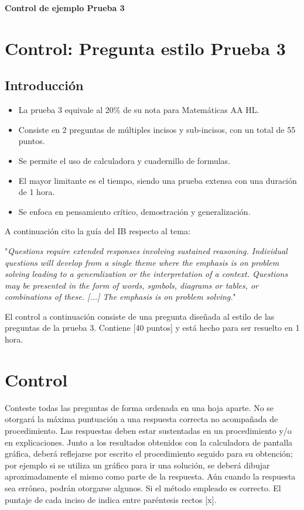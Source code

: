 \documentclass[spanish,12pt]{article}
\begin{document}
	\begin{titlepage}
	\begin{center}
	\hspace{0pt}
	\vfill
	{\Large\textbf{{Control de ejemplo Prueba 3}}}
	
	\thispagestyle{empty}
	\vfill
	\end{center}
	\end{titlepage}
\newpage
\section{Control: Pregunta estilo Prueba 3}
\subsection{Introducción}
\begin{itemize}
    \item La prueba 3 equivale al 20$\%$ de su nota para Matemáticas AA HL.
    \item Consiste en 2 preguntas de múltiples incisos y sub-incisos, con un total de 55 puntos.
    \item Se permite el uso de calculadora y cuadernillo de formulas.
    \item El mayor limitante es el tiempo, siendo una prueba extensa con una duración de 1 hora.
    \item Se enfoca en pensamiento crítico, demostración y generalización.
\end{itemize}
 
 A continuación cito la guía del IB respecto al tema:
 
 "\textit{Questions require extended responses involving sustained reasoning. Individual questions will develop from a single theme where the emphasis is on problem solving leading to a generalization or the interpretation of a context. Questions may be presented in the form of words, symbols, diagrams or tables, or combinations of these. [...] The emphasis is on problem solving.}"
 
 El control a continuación consiste de una pregunta diseñada al estilo de las preguntas de la prueba 3. Contiene [40 puntos] y está hecho para ser resuelto en 1 hora.
 \newpage
 \section{Control}
 Conteste todas las preguntas de forma ordenada en una hoja aparte. No se otorgará la máxima puntuación a una respuesta correcta no acompañada de procedimiento. Las respuestas deben estar sustentadas en un procedimiento y/o en explicaciones. Junto a los resultados obtenidos con la calculadora de pantalla gráfica, deberá reflejarse por escrito el procedimiento seguido para su obtención; por ejemplo si se utiliza un gráfico para ir una solución, se deberá dibujar aproximadamente el mismo como parte de la respuesta. Aún cuando la respuesta sea errónea, podrán otorgarse algunos. Si el método empleado es correcto. El puntaje de cada inciso de indica entre paréntesis rectos [x].
 
\end{document}
